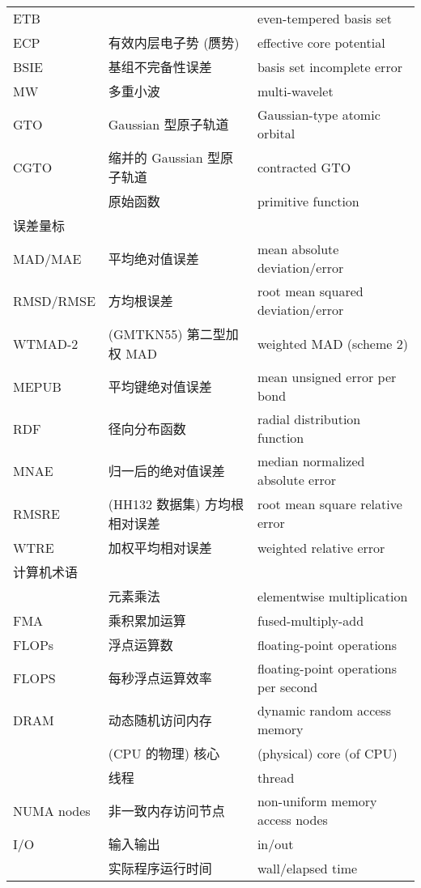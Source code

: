 \begin{longtable}{lll}
    ETB & & even-tempered basis set \\
    ECP & 有效内层电子势 (赝势) & effective core potential \\
    BSIE & 基组不完备性误差 & basis set incomplete error \\
    MW & 多重小波 & multi-wavelet \\
    GTO & Gaussian 型原子轨道 & Gaussian-type atomic orbital \\
    CGTO & 缩并的 Gaussian 型原子轨道 & contracted GTO \\
    & 原始函数 & primitive function \\
    \midrule
    \multicolumn{3}{l}{\textsf{误差量标}} \\
    MAD/MAE & 平均绝对值误差 & mean absolute deviation/error \\
    RMSD/RMSE & 方均根误差 & root mean squared deviation/error \\ 
    WTMAD-2 & (GMTKN55) 第二型加权 MAD & weighted MAD (scheme 2) \\
    MEPUB & 平均键绝对值误差 & mean unsigned error per bond \\
    RDF & 径向分布函数 & radial distribution function \\
    MNAE & 归一后的绝对值误差 & median normalized absolute error \\
    RMSRE & (HH132 数据集) 方均根相对误差 & root mean square relative error \\
    WTRE & 加权平均相对误差 & weighted relative error \\
    \midrule
    \multicolumn{3}{l}{\textsf{计算机术语}} \\
    & 元素乘法 & elementwise multiplication \\
    FMA & 乘积累加运算 & fused-multiply-add \\
    FLOPs & 浮点运算数 & floating-point operations \\
    FLOPS & 每秒浮点运算效率 & floating-point operations per second \\
    DRAM & 动态随机访问内存 & dynamic random access memory \\
    & (CPU 的物理) 核心 & (physical) core (of CPU) \\
    & 线程 & thread \\
    NUMA nodes & 非一致内存访问节点 & non-uniform memory access nodes \\
    I/O & 输入输出 & in/out \\
    & 实际程序运行时间 & wall/elapsed time \\

\end{longtable}
